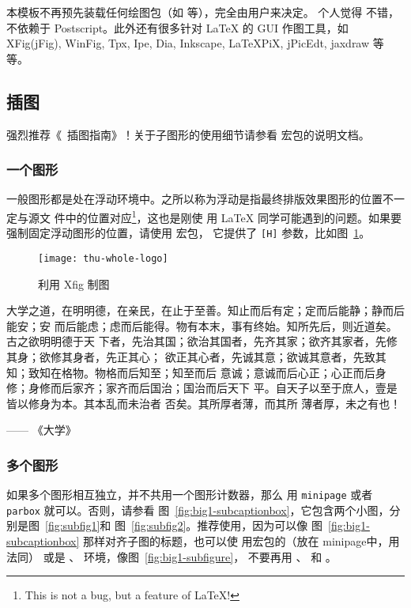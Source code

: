 本模板不再预先装载任何绘图包（如  等），完全由用户来决定。
个人觉得  不错，不依赖于 Postscript。此外还有很多针对 \LaTeX{} 的
 GUI 作图工具，如 XFig(jFig), WinFig, Tpx, Ipe, Dia, Inkscape, LaTeXPiX,
jPicEdt, jaxdraw 等等。

\subsection{插图}
\label{sec:graphs}

强烈推荐《\LaTeXe\ 插图指南》！关于子图形的使用细节请参看  宏包的说明文档。

\subsubsection{一个图形}
\label{sec:onefig}
一般图形都是处在浮动环境中。之所以称为浮动是指最终排版效果图形的位置不一定与源文
件中的位置对应\footnote{This is not a bug, but a feature of \LaTeX!}，这也是刚使
用 \LaTeX{} 同学可能遇到的问题。如果要强制固定浮动图形的位置，请使用  宏包，
它提供了 \texttt{[H]} 参数，比如图~\ref{fig:xfig1}。
\begin{figure}[H] %
  \centering
  \texttt{[image: thu-whole-logo]}
  \caption{利用 Xfig 制图}
  \label{fig:xfig1}
\end{figure}

大学之道，在明明德，在亲民，在止于至善。知止而后有定；定而后能静；静而后能安；安
而后能虑；虑而后能得。物有本末，事有终始。知所先后，则近道矣。古之欲明明德于天
下者，先治其国；欲治其国者，先齐其家；欲齐其家者，先修其身；欲修其身者，先正其心；
欲正其心者，先诚其意；欲诚其意者，先致其知；致知在格物。物格而后知至；知至而后
意诚；意诚而后心正；心正而后身 修；身修而后家齐；家齐而后国治；国治而后天下
平。自天子以至于庶人，壹是皆以修身为本。其本乱而未治者 否矣。其所厚者薄，而其所
薄者厚，未之有也！

\hfill —— 《大学》


\subsubsection{多个图形}
\label{sec:multifig}

如果多个图形相互独立，并不共用一个图形计数器，那么
用 \texttt{minipage} 或者\texttt{parbox} 就可以。否则，请参看
图~\ref{fig:big1-subcaptionbox}，它包含两个小图，分别是图~\ref{fig:subfig1}和
图~\ref{fig:subfig2}。推荐使用，因为可以像
图~\ref{fig:big1-subcaptionbox} 那样对齐子图的标题，也可以使
用宏包的（放在 minipage中，用法同）
或是  、 环境，像图~\ref{fig:big1-subfigure}，
不要再用 、 和 。

